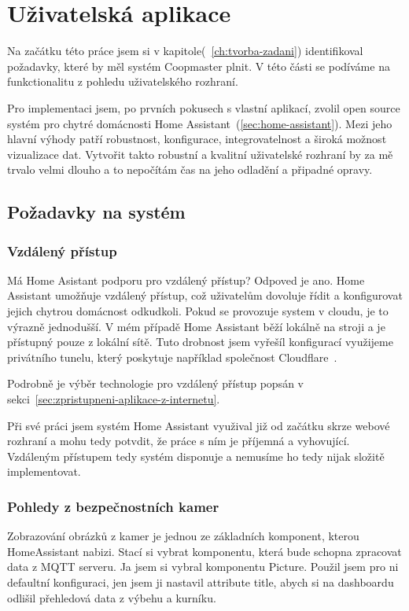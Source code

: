 \section{Uživatelská aplikace}\label{sec:tvorba-gui-rozhrani}
Na začátku této práce jsem si v kapitole(~\ref{ch:tvorba-zadani}) identifikoval požadavky, které by měl systém Coopmaster plnit.
V této části se podíváme na funkctionalitu z pohledu uživatelského rozhraní.

Pro implementaci jsem, po prvních pokusech s vlastní aplikací, zvolil open source systém pro chytré domácnosti Home Assistant~(\ref{sec:home-assistant}).
Mezi jeho hlavní výhody patří robustnost, konfigurace, integrovatelnost a široká možnost vizualizace dat.
Vytvořit takto robustní a kvalitní uživatelské rozhraní by za mě trvalo velmi dlouho a to nepočítám čas na jeho odladění a připadné opravy.

\subsection{Požadavky na systém}

\subsubsection*{Vzdálený přístup}
Má Home Asistant podporu pro vzdálený přístup? Odpoved je ano.
Home Assistant umožňuje vzdálený přístup, což uživatelům dovoluje řídit a konfigurovat jejich chytrou domácnost odkudkoli.
Pokud se provozuje system v cloudu, je to výrazně jednodušší.
V mém případě Home Assistant běží lokálně na stroji a je přístupný pouze z lokální sítě.
Tuto drobnost jsem vyřešíl konfigurací využijeme privátního tunelu, který poskytuje například společnost Cloudflare~\cite{cloudflare}.

Podrobně je výběr technologie pro vzdálený přístup popsán v sekci~\ref{sec:zpristupneni-aplikace-z-internetu}.

Při své práci jsem systém Home Assistant využival již od začátku skrze webové rozhraní a mohu tedy potvdit, že práce s ním je příjemná a vyhovující.
Vzdáleným přístupem tedy systém disponuje a nemusíme ho tedy nijak složitě implementovat.


\subsubsection*{Pohledy z bezpečnostních kamer}
Zobrazování obrázků z kamer je jednou ze základních komponent, kterou HomeAssistant nabizi.
Stací si vybrat komponentu, která bude schopna zpracovat data z MQTT serveru.
Ja jsem si vybral komponentu Picture.
Použil jsem pro ni defaultní konfiguraci, jen jsem ji nastavil attribute title, abych si na dashboardu odlišil přehledová data z výbehu a kurníku.

